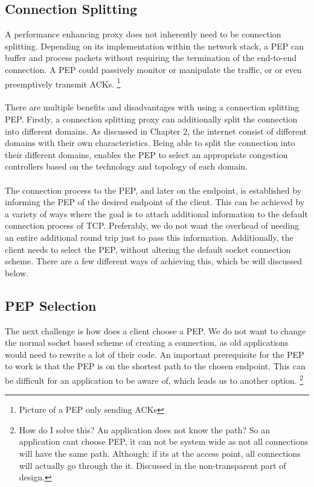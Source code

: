 \documentclass[a4paper,english, 11pt]{report}
\begin{document}
\subsection{Connection Splitting}
A performance enhancing proxy does not inherently need to be connection splitting. Depending on its implementation within the network stack, a PEP can buffer and process packets without requiring the termination of the end-to-end connection. A PEP could passively monitor or manipulate the traffic, or or even preemptively transmit ACKs.
\footnote{Picture of a PEP only sending ACKs}\\
\\
There are multiple benefits and disadvantages with using a connection splitting PEP. Firstly, a connection splitting proxy can additionally split the connection into different domains. As discussed in Chapter 2, the internet consist of different domains with their own characteristics. Being able to split the connection into their different domains, enables the PEP to select an appropriate congestion controllers based on the technology and topology of each domain.\\
\\
The connection process to the PEP, and later on the endpoint, is established by informing the PEP of the desired endpoint of the client. This can be achieved by a variety of ways where the goal is to attach additional information to the default connection process of TCP. Preferably, we do not want the overhead of needing an entire additional round trip just to pass this information. Additionally, the client needs to select the PEP, without altering the default socket connection scheme. There are a few different ways of achieving this, which be will discussed below.

\subsection{PEP Selection}
The next challenge is how does a client choose a PEP. We do not want to change the normal socket based scheme of creating a connection, as old applications would need to rewrite a lot of their code. An important prerequisite for the PEP to work is that the PEP is on the shortest path to the chosen endpoint. This can be difficult for an application to be aware of, which leads us to another option. \footnote{How do I solve this? An application does not know the path? So an application cant choose PEP, it can not be system wide as not all connections will have the same path. Although: if its at the access point, all connections will actually go through the it. Discussed in the non-transparent part of design.}
\end{document}
